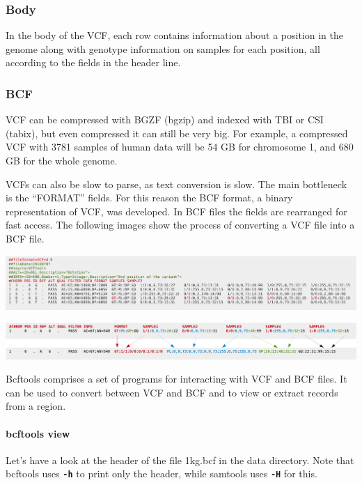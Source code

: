 \documentclass[11pt]{article}
\makeatletter
\def\maxwidth{\ifdim\Gin@nat@width>\linewidth\linewidth
    \else\Gin@nat@width\fi}
\let\Oldincludegraphics\includegraphics
\renewcommand{\includegraphics}[1]{\Oldincludegraphics[width=.8\maxwidth, height=.55\textheight, keepaspectratio]{#1}}
\makeatother
\begin{document}
\hypertarget{body}{%
\subsubsection{Body}\label{body}}

In the body of the VCF, each row contains information about a position
in the genome along with genotype information on samples for each
position, all according to the fields in the header line.

\hypertarget{bcf}{%
\subsubsection{BCF}\label{bcf}}

VCF can be compressed with BGZF (bgzip) and indexed with TBI or CSI
(tabix), but even compressed it can still be very big. For example, a
compressed VCF with 3781 samples of human data will be 54 GB for
chromosome 1, and 680 GB for the whole genome.

VCFs can also be slow to parse, as text conversion is slow. The main
bottleneck is the ``FORMAT'' fields. For this reason the BCF format, a
binary representation of VCF, was developed. In BCF files the fields are
rearranged for fast access. The following images show the process of
converting a VCF file into a BCF file.

    \includegraphics{img/VCF2.png}

    \includegraphics{img/VCF3.png}

    Bcftools comprises a set of programs for interacting with VCF and BCF
files. It can be used to convert between VCF and BCF and to view or
extract records from a region.

\hypertarget{bcftools-view}{%
\paragraph{bcftools view}\label{bcftools-view}}

Let's have a look at the header of the file 1kg.bcf in the data
directory. Note that bcftools uses \textbf{\texttt{-h}} to print only
the header, while samtools uses \textbf{\texttt{-H}} for this.
\end{document}
